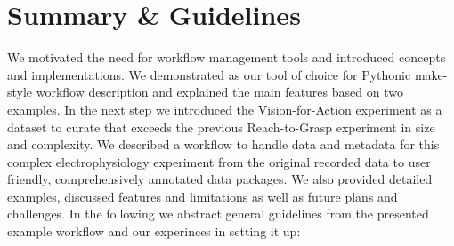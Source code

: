 \section{Summary \& Guidelines}
\label{sec:guidelines}
We motivated the need for workflow management tools and introduced concepts and implementations. We demonstrated  as our tool of choice for Pythonic make-style workflow description and explained the main features based on two examples. In the next step we introduced the Vision-for-Action experiment as a dataset to curate that exceeds the previous Reach-to-Grasp experiment in size and complexity. We described a workflow to handle data and metadata for this complex electrophysiology experiment from the original recorded data to user friendly, comprehensively annotated data packages. We also provided detailed examples, discussed features and limitations as well as future plans and challenges. In the following we abstract general guidelines from the presented example workflow and our experinces in setting it up:

